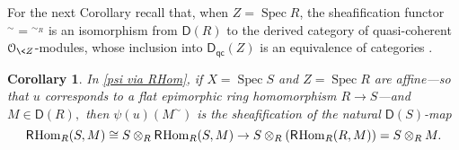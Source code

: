 \documentclass{compositio}
\theoremstyle{plain}
\newtheorem{subcor}[equation]{Corollary}
\theoremstyle{definition}
\theoremstyle{remark}
\numberwithin{equation}{thm}
\begin{document}
For the next Corollary recall that, when $Z=\operatorname{Spec} R$, the sheafification functor 
${}^\sim={}^{\sim_R}$ is an isomorphism
from ${\boldsymbol{\mathsf{D}}}(R)$ to the derived category of quasi-coherent ${\mathcal O_{\<Z}}$-modules, whose inclusion into
${{\boldsymbol{\mathsf{D}}}_{\mathsf{qc}}}(Z)$ is an equivalence of categories \cite[p.\,230, 5.5]{BN}. 
 
 
\begin{subcor}\label{affine locimm}
In\/ \textup{\ref{psi via RHom},} if\/ $X=\operatorname{Spec} S$ and\/ $Z=\operatorname{Spec} R$ are affine---so that $u$ corresponds to a flat epimorphic ring homomorphism $R\to S$---and\/ $M\in{\boldsymbol{\mathsf{D}}}(R),$
then\/ $\psi(u)(M^\sim)$ is the sheafification of the natural \/ ${\boldsymbol{\mathsf{D}}}(S)$-map
\[
{\mathsf R}{\mkern-1mu}{\mkern-1mu}\operatorname{Hom}_R(S,M)\cong S\otimes_R {\mathsf R}{\mkern-1mu}{\mkern-1mu}\operatorname{Hom}_R(S,M)\to S\otimes_R ({\mathsf R}{\mkern-1mu}{\mkern-1mu}\operatorname{Hom}_R(R,M))=S\otimes_R M.
\]
\end{subcor}
\end{document}
